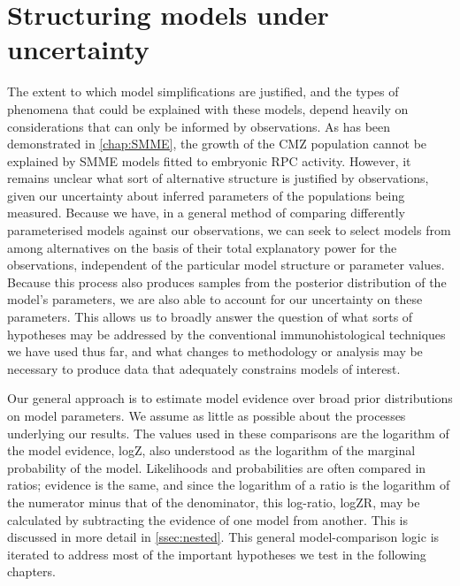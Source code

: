 \section{Structuring models under uncertainty}
The extent to which model simplifications are justified, and the types of phenomena that could be explained with these models, depend heavily on considerations that can only be informed by observations. As has been demonstrated in \autoref{chap:SMME}, the growth of the CMZ population cannot be explained by SMME models fitted to embryonic RPC activity. However, it remains unclear what sort of alternative structure is justified by observations, given our uncertainty about inferred parameters of the populations being measured. Because we have, in  a general method of comparing differently parameterised models against our observations, we can seek to select models from among alternatives on the basis of their total explanatory power for the observations, independent of the particular model structure or parameter values. Because this process also produces samples from the posterior distribution of the model's parameters, we are also able to account for our uncertainty on these parameters. This allows us to broadly answer the question of what sorts of hypotheses may be addressed by the conventional immunohistological techniques we have used thus far, and what changes to methodology or analysis may be necessary to produce data that adequately constrains models of interest.

Our general approach is to estimate model evidence over broad prior distributions on model parameters. We assume as little as possible about the processes underlying our results. The values used in these comparisons are the logarithm of the model evidence, logZ, also understood as the logarithm of the marginal probability of the model. Likelihoods and probabilities are often compared in ratios; evidence is the same, and since the logarithm of a ratio is the logarithm of the numerator minus that of the denominator, this log-ratio, logZR, may be calculated by subtracting the evidence of one model from another. This is discussed in more detail in \autoref{ssec:nested}. This general model-comparison logic is iterated to address most of the important hypotheses we test in the following chapters.